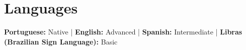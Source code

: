 \documentclass[11pt]{article}
\begin{document}
\section{Languages}
 \begin{itemize}[leftmargin=0.15in, label={}]
    \small{\item{
     \textbf{Portuguese:} Native \quad | \quad
     \textbf{English:} Advanced \quad | \quad
     \textbf{Spanish:} Intermediate \quad | \quad
     \textbf{Libras (Brazilian Sign Language):} Basic
    }}
 \end{itemize}
\end{document}
